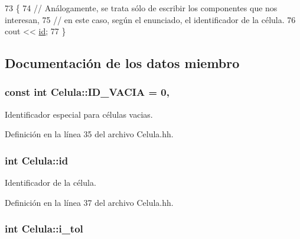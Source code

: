 \begin{DoxyCode}
73 \{
74   \textcolor{comment}{// Análogamente, se trata sólo de escribir los componentes que nos interesan,}
75   \textcolor{comment}{// en este caso, según el enunciado, el identificador de la célula.}
76   cout << \hyperlink{class_celula_a0984a8b3deeed4979ed6f6141edc3c0c}{id};
77 \}
\end{DoxyCode}


\subsection{Documentación de los datos miembro}
\subsubsection[{\texorpdfstring{I\+D\+\_\+\+V\+A\+C\+IA}{ID_VACIA}}]{\setlength{\rightskip}{0pt plus 5cm}const int Celula\+::\+I\+D\+\_\+\+V\+A\+C\+IA = 0\hspace{0.3cm}{\ttfamily [static]}, {\ttfamily [private]}}\hypertarget{class_celula_affff67b41ead0b1f3a3f4faad6c049ac}{}\label{class_celula_affff67b41ead0b1f3a3f4faad6c049ac}


Identificador especial para células vacias. 



Definición en la línea 35 del archivo Celula.\+hh.

\subsubsection[{\texorpdfstring{id}{id}}]{\setlength{\rightskip}{0pt plus 5cm}int Celula\+::id\hspace{0.3cm}{\ttfamily [private]}}\hypertarget{class_celula_a0984a8b3deeed4979ed6f6141edc3c0c}{}\label{class_celula_a0984a8b3deeed4979ed6f6141edc3c0c}


Identificador de la célula. 



Definición en la línea 37 del archivo Celula.\+hh.

\subsubsection[{\texorpdfstring{i\+\_\+tol}{i_tol}}]{\setlength{\rightskip}{0pt plus 5cm}int Celula\+::i\+\_\+tol\hspace{0.3cm}{\ttfamily [private]}}\hypertarget{class_celula_abda46be7b30a13909d9819c46238080b}{}\label{class_celula_abda46be7b30a13909d9819c46238080b}


